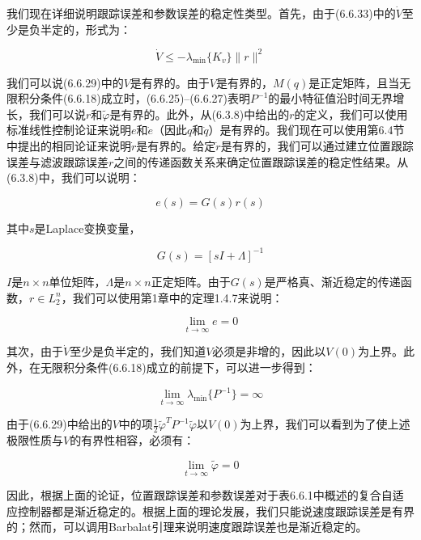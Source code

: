 \documentclass[12pt,a4paper]{ctexart}
\begin{document}
我们现在详细说明跟踪误差和参数误差的稳定性类型。首先，由于(6.6.33)中的$\dot{V}$至少是负半定的，形式为：

\begin{equation}\label{eq:6.6.34}
\dot{V} \leq -\lambda_{\min}\{K_v\} \|r\|^2
\end{equation}

我们可以说(6.6.29)中的$V$是有界的。由于$V$是有界的，$M(q)$是正定矩阵，且当无限积分条件(6.6.18)成立时，(6.6.25)--(6.6.27)表明$P^{-1}$的最小特征值沿时间无界增长，我们可以说$r$和$\tilde{\varphi}$是有界的。此外，从(6.3.8)中给出的$r$的定义，我们可以使用标准线性控制论证来说明$e$和$\dot{e}$（因此$q$和$\dot{q}$）是有界的。我们现在可以使用第6.4节中提出的相同论证来说明$\dot{r}$是有界的。给定$\dot{r}$是有界的，我们可以通过建立位置跟踪误差与滤波跟踪误差$r$之间的传递函数关系来确定位置跟踪误差的稳定性结果。从(6.3.8)中，我们可以说明：

\begin{equation}\label{eq:6.6.35}
e(s) = G(s)r(s)
\end{equation}

其中$s$是Laplace变换变量，

\begin{equation}\label{eq:6.6.36}
G(s) = [sI + \Lambda]^{-1}
\end{equation}

$I$是$n \times n$单位矩阵，$\Lambda$是$n \times n$正定矩阵。由于$G(s)$是严格真、渐近稳定的传递函数，$r \in L_2^{n}$，我们可以使用第1章中的定理1.4.7来说明：

\begin{equation}\label{eq:6.6.37}
\lim_{t \to \infty} e = 0
\end{equation}

其次，由于$\dot{V}$至少是负半定的，我们知道$V$必须是非增的，因此以$V(0)$为上界。此外，在无限积分条件(6.6.18)成立的前提下，可以进一步得到：

\begin{equation}\label{eq:6.6.38}
\lim_{t \to \infty} \lambda_{\min}\{P^{-1}\} = \infty
\end{equation}

由于(6.6.29)中给出的$V$中的项$\frac{1}{2}\tilde{\varphi}^T P^{-1} \tilde{\varphi}$以$V(0)$为上界，我们可以看到为了使上述极限性质与$V$的有界性相容，必须有：

\begin{equation}\label{eq:6.6.39}
\lim_{t \to \infty} \tilde{\varphi} = 0
\end{equation}

因此，根据上面的论证，位置跟踪误差和参数误差对于表6.6.1中概述的复合自适应控制器都是渐近稳定的。根据上面的理论发展，我们只能说速度跟踪误差是有界的；然而，可以调用Barbalat引理来说明速度跟踪误差也是渐近稳定的。
\end{document}
